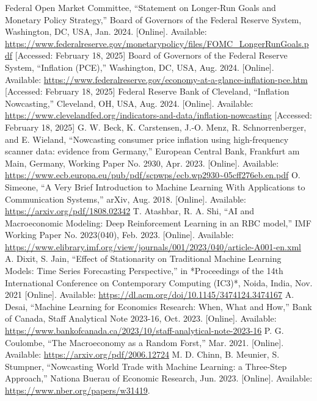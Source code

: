\documentclass[conference]{IEEEtran}
\begin{document}
\begin{thebibliography}{00}
     Federal Open Market Committee, ``Statement on Longer-Run Goals and Monetary Policy Strategy,'' Board of Governors of the Federal Reserve System, Washington, DC, USA, Jan. 2024. [Online]. Available: \url{https://www.federalreserve.gov/monetarypolicy/files/FOMC_LongerRunGoals.pdf} [Accessed: February 18, 2025]
     Board of Governors of the Federal Reserve System, ``Inflation (PCE),'' Washington, DC, USA, Aug. 2024. [Online]. Available: \url{https://www.federalreserve.gov/economy-at-a-glance-inflation-pce.htm} [Accessed: February 18, 2025]
     Federal Reserve Bank of Cleveland, ``Inflation Nowcasting,'' Cleveland, OH, USA, Aug. 2024. [Online]. Available: \url{https://www.clevelandfed.org/indicators-and-data/inflation-nowcasting} [Accessed: February 18, 2025]
     G. W. Beck, K. Carstensen, J.-O. Menz, R. Schnorrenberger, and E. Wieland, ``Nowcasting consumer price inflation using high-frequency scanner data: evidence from Germany,'' European Central Bank, Frankfurt am Main, Germany, Working Paper No. 2930, Apr. 2023. [Online]. Available: \url{https://www.ecb.europa.eu/pub/pdf/scpwps/ecb.wp2930~05cff276eb.en.pdf}
     O. Simeone, ``A Very Brief Introduction to Machine Learning With Applications to Communication Systems,'' arXiv, Aug. 2018. [Online]. Available: \url{https://arxiv.org/pdf/1808.02342}
     T. Atashbar, R. A. Shi, ``AI and Macroeconomic Modeling: Deep Reinforcement Learning in an RBC model,'' IMF Working Paper No. 2023(040), Feb. 2023. [Online]. Available: \url{https://www.elibrary.imf.org/view/journals/001/2023/040/article-A001-en.xml}
     A. Dixit, S. Jain, ``Effect of Stationarity on Traditional Machine Learning Models: Time Series Forecasting Perspective,'' in *Proceedings of the 14th International Conference on Contemporary Computing (IC3)*, Noida, India, Nov. 2021 [Online]. Available: \url{https://dl.acm.org/doi/10.1145/3474124.3474167}
     A. Desai, ``Machine Learning for Economics Research: When, What and How,'' Bank of Canada, Staff Analytical Note 2023-16, Oct. 2023. [Online]. Available: \url{https://www.bankofcanada.ca/2023/10/staff-analytical-note-2023-16}
     P. G. Coulombe, ``The Macroeconomy as a Random Forst,'' Mar. 2021. [Online]. Available: \url{https://arxiv.org/pdf/2006.12724}
     M. D. Chinn, B. Meunier, S. Stumpner, ``Nowcasting World Trade with Machine Learning: a Three-Step Approach,'' Nationa Buerau of Economic Research, Jun. 2023. [Online]. Available: \url{https://www.nber.org/papers/w31419}.

\end{thebibliography}
\end{document}
